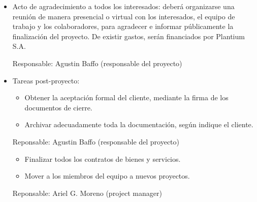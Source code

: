 \documentclass[
11pt, %
]{charter}
\begin{document}
\begin{itemize}
\item Acto de agradecimiento a todos los interesados: deberá organizarse una reunión de manera presencial o virtual con los interesados, el equipo de trabajo y los colaboradores, para agradecer e informar públicamente la finalización del proyecto. De existir gastos, serán financiados por Plantium S.A.

Responsable: Agustin Baffo (responsable del proyecto)

\item Tareas post-proyecto:
\begin{itemize}
\item Obtener la aceptación formal del cliente, mediante la firma de los documentos de cierre.
\item Archivar adecuadamente toda la documentación, según indique el cliente.
\end{itemize}

Reponsable: Agustin Baffo (responsable del proyecto)
\begin{itemize}
\item Finalizar todos los contratos de bienes y servicios.
\item Mover a los miembros del equipo a nuevos proyectos.

\end{itemize}
Reponsable: Ariel G. Moreno (project manager)

\end{itemize}
\end{document}
